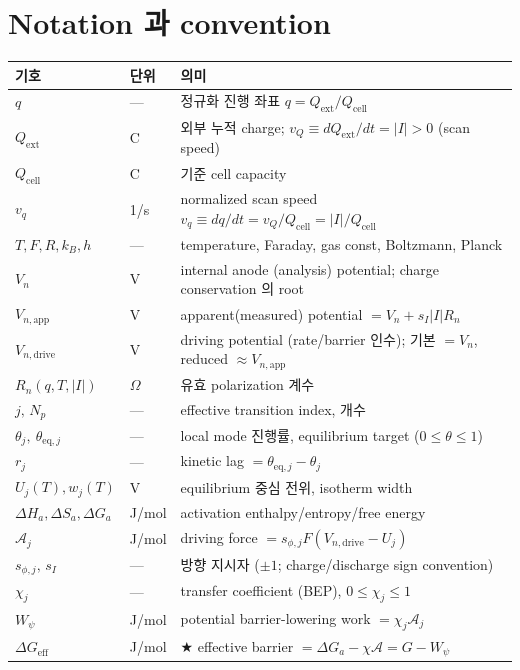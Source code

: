 \documentclass[11pt,a4paper]{article}
\newcommand{\eff}{\mathrm{eff}}
\newcommand{\eq}{\mathrm{eq}}
\newcommand{\app}{\mathrm{app}}
\newcommand{\dimedrive}{\mathrm{drive}}
\newcommand{\cell}{\mathrm{cell}}
\newcommand{\ext}{\mathrm{ext}}
\begin{document}
\section{Notation 과 convention}\label{sec:notation}
\begin{longtable}{p{} p{} p{}}
\toprule 기호 & 단위 & 의미 \\ \midrule \endhead
$q$ & --- & 정규화 진행 좌표 $q=Q_\ext/Q_\cell$ \\
$Q_\ext$ & C & 외부 누적 charge; $v_Q\equiv dQ_\ext/dt=|I|>0$ (scan speed) \\
$Q_\cell$ & C & 기준 cell capacity \\
$v_q$ & 1/s & normalized scan speed $v_q\equiv dq/dt=v_Q/Q_\cell=|I|/Q_\cell$ \\
$T,F,R,k_B,h$ & --- & temperature, Faraday, gas const, Boltzmann, Planck \\
$V_n$ & V & internal anode (analysis) potential; charge conservation 의 root \\
$V_{n,\app}$ & V & apparent(measured) potential $=V_n+s_I|I|R_n$ \\
$V_{n,\dimedrive}$ & V & driving potential (rate/barrier 인수); 기본 $=V_n$, reduced $\approx V_{n,\app}$ \\
$R_n(q,T,|I|)$ & $\Omega$ & 유효 polarization 계수 \\
$j,\,N_p$ & --- & effective transition index, 개수 \\
$\theta_j,\ \theta_{\eq,j}$ & --- & local mode 진행률, equilibrium target ($0\!\le\!\theta\!\le\!1$) \\
$r_j$ & --- & kinetic lag $=\theta_{\eq,j}-\theta_j$ \\
$U_j(T),w_j(T)$ & V & equilibrium 중심 전위, isotherm width \\
$\Delta H_{a},\Delta S_{a},\Delta G_a$ & J/mol & activation enthalpy/entropy/free energy \\
$\mathcal A_j$ & J/mol & driving force $=s_{\phi,j}F(V_{n,\dimedrive}-U_j)$ \\
$s_{\phi,j},\,s_I$ & --- & 방향 지시자 ($\pm1$; charge/discharge sign convention) \\
$\chi_j$ & --- & transfer coefficient (BEP), $0\le\chi_j\le1$ \\
$W_\psi$ & J/mol & potential barrier-lowering work $=\chi_j\mathcal A_j$ \\
$\Delta G_{\eff}$ & J/mol & ★ effective barrier $=\Delta G_a-\chi\mathcal A=G-W_\psi$ \\

\end{longtable}
\end{document}
